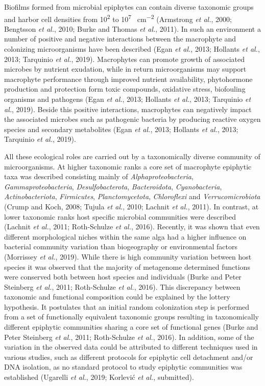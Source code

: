 \documentclass[12pt,]{article}
\begin{document}
Biofilms formed from microbial epiphytes can contain diverse taxonomic
groups and harbor cell densities from 10\textsuperscript{2} to
10\textsuperscript{7} \si{\cells\per\cm\squared} (Armstrong \emph{et
al.}, 2000; Bengtsson \emph{et al.}, 2010; Burke and Thomas \emph{et
al.}, 2011). In such an environment a number of positive and negative
interactions between the macrophyte and colonizing microorganisms have
been described (Egan \emph{et al.}, 2013; Hollants \emph{et al.}, 2013;
Tarquinio \emph{et al.}, 2019). Macrophytes can promote growth of
associated microbes by nutrient exudation, while in return
microorganisms may support macrophyte performance through improved
nutrient availability, phytohormone production and protection form toxic
compounds, oxidative stress, biofouling organisms and pathogens (Egan
\emph{et al.}, 2013; Hollants \emph{et al.}, 2013; Tarquinio \emph{et
al.}, 2019). Beside this positive interactions, macrophytes can
negatively impact the associated microbes such as pathogenic bacteria by
producing reactive oxygen species and secondary metabolites (Egan
\emph{et al.}, 2013; Hollants \emph{et al.}, 2013; Tarquinio \emph{et
al.}, 2019).

All these ecological roles are carried out by a taxonomically diverse
community of microorganisms. At higher taxonomic ranks a core set of
macrophyte epiphytic taxa was described consisting mainly of
\emph{Alphaproteobacteria}, \emph{Gammaproteobacteria},
\emph{Desulfobacterota}, \emph{Bacteroidota}, \emph{Cyanobacteria},
\emph{Actinobacteriota}, \emph{Firmicutes}, \emph{Planctomycetota},
\emph{Chloroflexi} and \emph{Verrucomicrobiota} (Crump and Koch, 2008;
Tujula \emph{et al.}, 2010; Lachnit \emph{et al.}, 2011). In contrast,
at lower taxonomic ranks host specific microbial communities were
described (Lachnit \emph{et al.}, 2011; Roth-Schulze \emph{et al.},
2016). Recently, it was shown that even different morphological niches
within the same alga had a higher influence on bacterial community
variation than biogeography or environmental factors (Morrissey \emph{et
al.}, 2019). While there is high community variation between host
species it was observed that the majority of metagenome determined
functions were conserved both between host species and individuals
(Burke and Peter Steinberg \emph{et al.}, 2011; Roth-Schulze \emph{et
al.}, 2016). This discrepancy between taxonomic and functional
composition could be explained by the lottery hypothesis. It postulates
that an initial random colonization step is performed from a set of
functionally equivalent taxonomic groups resulting in taxonomically
different epiphytic communities sharing a core set of functional genes
(Burke and Peter Steinberg \emph{et al.}, 2011; Roth-Schulze \emph{et
al.}, 2016). In addition, some of the variation in the observed data
could be attributed to different techniques used in various studies,
such as different protocols for epiphytic cell detachment and/or DNA
isolation, as no standard protocol to study epiphytic communities was
established (Ugarelli \emph{et al.}, 2019; Korlević \emph{et al.},
submitted).
\end{document}

